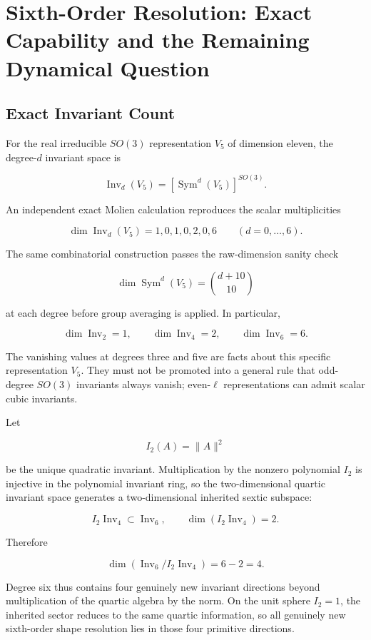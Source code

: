 \chapter{Sixth-Order Resolution: Exact Capability and the Remaining Dynamical Question}

\section{Exact Invariant Count}

For the real irreducible $SO(3)$ representation $V_5$ of dimension eleven, the degree-$d$ invariant space is

\[
\operatorname{Inv}_d(V_5)=\left[\operatorname{Sym}^d(V_5)\right]^{SO(3)}.
\]

An independent exact Molien calculation reproduces the scalar multiplicities

\[
\dim\operatorname{Inv}_d(V_5)=1,0,1,0,2,0,6
\qquad(d=0,\ldots,6).
\]

The same combinatorial construction passes the raw-dimension sanity check

\[
\dim\operatorname{Sym}^d(V_5)=\binom{d+10}{10}
\]

at each degree before group averaging is applied. In particular,

\[
\dim\operatorname{Inv}_2=1,
\qquad
\dim\operatorname{Inv}_4=2,
\qquad
\boxed{\dim\operatorname{Inv}_6=6}.
\]

The vanishing values at degrees three and five are facts about this specific representation $V_5$. They must not be promoted into a general rule that odd-degree $SO(3)$ invariants always vanish; even-$\ell$ representations can admit scalar cubic invariants.

Let

\[
I_2(A)=\|A\|^2
\]

be the unique quadratic invariant. Multiplication by the nonzero polynomial $I_2$ is injective in the polynomial invariant ring, so the two-dimensional quartic invariant space generates a two-dimensional inherited sextic subspace:

\[
I_2\operatorname{Inv}_4\subset\operatorname{Inv}_6,
\qquad
\dim(I_2\operatorname{Inv}_4)=2.
\]

Therefore

\[
\boxed{
\dim\left(\operatorname{Inv}_6/I_2\operatorname{Inv}_4\right)=6-2=4.
}
\]

Degree six thus contains four genuinely new invariant directions beyond multiplication of the quartic algebra by the norm. On the unit sphere $I_2=1$, the inherited sector reduces to the same quartic information, so all genuinely new sixth-order shape resolution lies in those four primitive directions.

